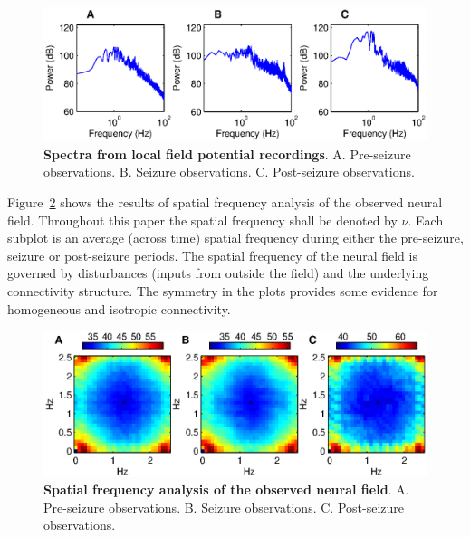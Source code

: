 \documentclass[]{article}
\begin{document}
\begin{figure}[!ht]
\begin{center}
\includegraphics{./Figures/TemporalFreq.eps}
\end{center}
\caption{{\bf Spectra from local field potential recordings}. A. Pre-seizure observations. B. Seizure observations. C. Post-seizure observations.}
\label{fig:TemporalFreqObservation}
\end{figure}

Figure~\ref{fig:SpatialFreqObservation} shows the results of spatial frequency analysis of the observed neural field. Throughout this paper the spatial frequency shall be denoted by $\nu$. Each subplot is an average (across time) spatial frequency during either the pre-seizure, seizure or post-seizure periods. The spatial frequency of the neural field is governed by disturbances (inputs from outside the field) and the underlying connectivity structure. The symmetry in the plots provides some evidence for homogeneous and isotropic connectivity.   

\begin{figure}[!ht]
\begin{center}
\includegraphics{./Figures/SpatialFreq.eps}
\end{center}
\caption{{\bf Spatial frequency analysis of the observed neural field}. A. Pre-seizure observations. B. Seizure observations. C. Post-seizure observations.}
\label{fig:SpatialFreqObservation}
\end{figure}
\end{document}
